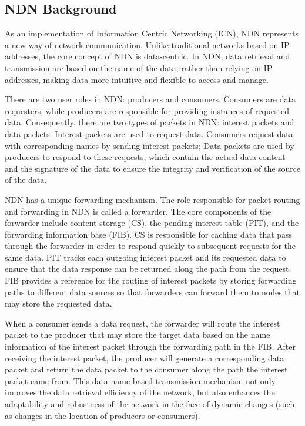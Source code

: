 \documentclass[conference]{IEEEtran}
\begin{document}
\subsection{NDN Background}
As an implementation of Information Centric Networking (ICN), NDN represents a new way of network communication. Unlike traditional networks based on IP addresses, the core concept of NDN is data-centric. In NDN, data retrieval and transmission are based on the name of the data, rather than relying on IP addresses, making data more intuitive and flexible to access and manage.

There are two user roles in NDN: producers and consumers. Consumers are data requesters, while producers are responsible for providing instances of requested data. Consequently, there are two types of packets in NDN: interest packets and data packets. Interest packets are used to request data. Consumers request data with corresponding names by sending interest packets; Data packets are used by producers to respond to these requests, which contain the actual data content and the signature of the data to ensure the integrity and verification of the source of the data.

NDN has a unique forwarding mechanism. The role responsible for packet routing and forwarding in NDN is called a forwarder. The core components of the forwarder include content storage (CS), the pending interest table (PIT), and the forwarding information base (FIB). CS is responsible for caching data that pass through the forwarder in order to respond quickly to subsequent requests for the same data. PIT tracks each outgoing interest packet and its requested data to ensure that the data response can be returned along the path from the request. FIB provides a reference for the routing of interest packets by storing forwarding paths to different data sources so that forwarders can forward them to nodes that may store the requested data.

When a consumer sends a data request, the forwarder will route the interest packet to the producer that may store the target data based on the name information of the interest packet through the forwarding path in the FIB. After receiving the interest packet, the producer will generate a corresponding data packet and return the data packet to the consumer along the path the interest packet came from. This data name-based transmission mechanism not only improves the data retrieval efficiency of the network, but also enhances the adaptability and robustness of the network in the face of dynamic changes (such as changes in the location of producers or consumers).
\end{document}
